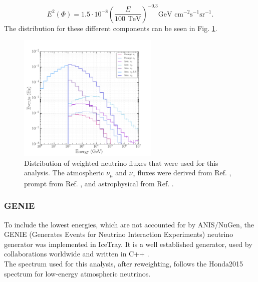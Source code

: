 \begin{equation}
E^2 \left(\Phi \right) = 1.5 \cdot 10^{-8} \left( \frac{E}{100 \textrm{ TeV}} \right)^{-0.3} \textrm{GeV } \textrm{cm}^{-2} \textrm{s}^{-1} \textrm{sr}^{-1}.
\end{equation}
\vspace{3mm}
\noindent The distribution for these different components can be seen in Fig. \ref{fig:neutrinospectrum}.

\begin{figure}
\centering
\includegraphics[width=0.6\textwidth]{chapter6/img/neutrinoenergy.png}
\caption{Distribution of weighted neutrino fluxes that were used for this analysis. The atmospheric $\nu_\mu$ and $\nu_e$ fluxes were derived from Ref. \cite{Honda:2006qj}, prompt from Ref. \cite{Enberg:2008te}, and astrophysical from Ref. \cite{Aartsen:2014gkd}.}
\label{fig:neutrinospectrum}
\end{figure}

\subsubsection{GENIE}
To include the lowest energies, which are not accounted for by ANIS/NuGen, the GENIE (Generates Events for Neutrino Interaction Experiments) neutrino generator was implemented in IceTray. It is a well established generator, used by collaborations worldwide and written in C++ \cite{Andreopoulos:2009rq,Andreopoulos:2015wxa}.\\

\noindent The spectrum used for this analysis, after reweighting, follows the Honda2015 spectrum \cite{Honda:2015fha} for low-energy atmospheric neutrinos.

